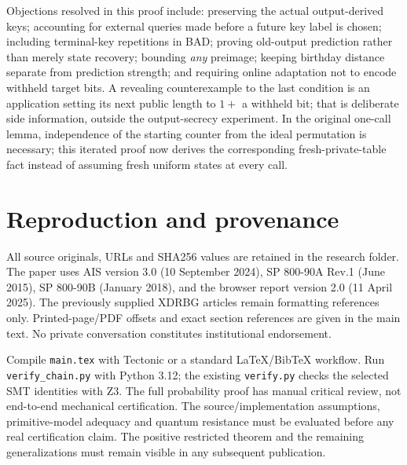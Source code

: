 \documentclass[11 pt,a 4 paper]{article}
\begin{document}
Objections resolved in this proof include: preserving the actual output-derived keys; accounting for external queries made before a future key label is chosen; including terminal-key repetitions in BAD; proving old-output prediction rather than merely state recovery; bounding \emph{any} preimage; keeping birthday distance separate from prediction strength; and requiring online adaptation not to encode withheld target bits. A revealing counterexample to the last condition is an application setting its next public length to $1+$ a withheld bit; that is deliberate side information, outside the output-secrecy experiment. In the original one-call lemma, independence of the starting counter from the ideal permutation is necessary; this iterated proof now derives the corresponding fresh-private-table fact instead of assuming fresh uniform states at every call.

\section{Reproduction and provenance}
All source originals, URLs and SHA256 values are retained in the research folder. The paper uses AIS version 3.0 (10 September 2024), SP 800-90A Rev.1 (June 2015), SP 800-90B (January 2018), and the browser report version 2.0 (11 April 2025). The previously supplied XDRBG articles remain formatting references only. Printed-page/PDF offsets and exact section references are given in the main text. No private conversation constitutes institutional endorsement.

Compile \texttt{main.tex} with Tectonic or a standard LaTeX/BibTeX workflow. Run \texttt{verify\_chain.py} with Python 3.12; the existing \texttt{verify.py} checks the selected SMT identities with Z3. The full probability proof has manual critical review, not end-to-end mechanical certification. The source/implementation assumptions, primitive-model adequacy and quantum resistance must be evaluated before any real certification claim. The positive restricted theorem and the remaining generalizations must remain visible in any subsequent publication.


\raggedright

\end{document}
